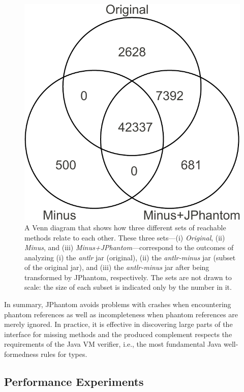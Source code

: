 \begin{figure}[t]
  \centering
  \includegraphics[scale=0.65]{figures/complementation/venn.pdf}
  \caption[Reachable Methods Venn Diagram]{ A Venn diagram that shows
    how three different sets of reachable methods relate to each
    other. These three sets---(i) \emph{Original}, (ii) \emph{Minus},
    and (iii) \emph{Minus+JPhantom}---correspond to the outcomes of
    analyzing (i) the \emph{antlr} jar (original), (ii) the
    \emph{antlr-minus} jar (subset of the original jar), and (iii) the
    \emph{antlr-minus} jar after being transformed by JPhantom,
    respectively. The sets are not drawn to scale: the size of each
    subset is indicated only by the number in it.}
  \label{hiercomp/fig:venn}
\end{figure}

In summary, JPhantom avoids problems with crashes when encountering
phantom references as well as incompleteness when phantom references
are merely ignored. In practice, it is effective in discovering large
parts of the interface for missing methods and the produced complement
respects the requirements of the Java VM verifier, i.e., the most
fundamental Java well-formedness rules for types.


\subsection{Performance Experiments}


